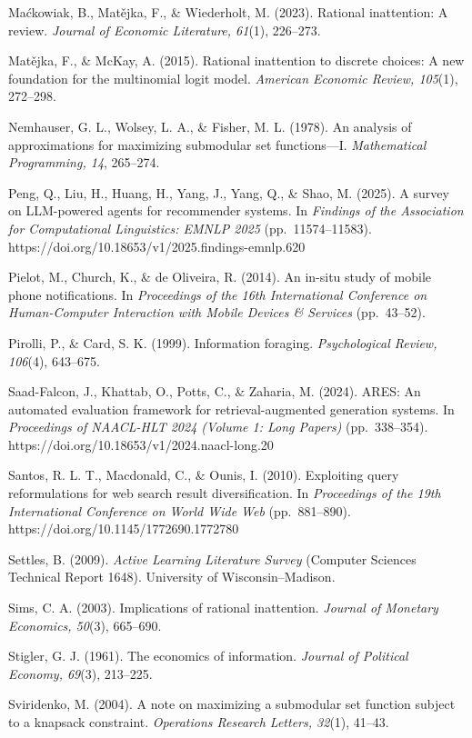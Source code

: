 \documentclass[
  11pt]{article}
\begin{document}
Maćkowiak, B., Matějka, F., \& Wiederholt, M. (2023). Rational
inattention: A review. \emph{Journal of Economic Literature, 61}(1),
226--273.

Matějka, F., \& McKay, A. (2015). Rational inattention to discrete
choices: A new foundation for the multinomial logit model.
\emph{American Economic Review, 105}(1), 272--298.

Nemhauser, G. L., Wolsey, L. A., \& Fisher, M. L. (1978). An analysis of
approximations for maximizing submodular set functions---I.
\emph{Mathematical Programming, 14}, 265--274.

Peng, Q., Liu, H., Huang, H., Yang, J., Yang, Q., \& Shao, M. (2025). A
survey on LLM-powered agents for recommender systems. In \emph{Findings
of the Association for Computational Linguistics: EMNLP 2025}
(pp.~11574--11583). https://doi.org/10.18653/v1/2025.findings-emnlp.620

Pielot, M., Church, K., \& de Oliveira, R. (2014). An in-situ study of
mobile phone notifications. In \emph{Proceedings of the 16th
International Conference on Human-Computer Interaction with Mobile
Devices \& Services} (pp.~43--52).

Pirolli, P., \& Card, S. K. (1999). Information foraging.
\emph{Psychological Review, 106}(4), 643--675.

Saad-Falcon, J., Khattab, O., Potts, C., \& Zaharia, M. (2024). ARES: An
automated evaluation framework for retrieval-augmented generation
systems. In \emph{Proceedings of NAACL-HLT 2024 (Volume 1: Long Papers)}
(pp.~338--354). https://doi.org/10.18653/v1/2024.naacl-long.20

Santos, R. L. T., Macdonald, C., \& Ounis, I. (2010). Exploiting query
reformulations for web search result diversification. In
\emph{Proceedings of the 19th International Conference on World Wide
Web} (pp.~881--890). https://doi.org/10.1145/1772690.1772780

Settles, B. (2009). \emph{Active Learning Literature Survey} (Computer
Sciences Technical Report 1648). University of Wisconsin--Madison.

Sims, C. A. (2003). Implications of rational inattention. \emph{Journal
of Monetary Economics, 50}(3), 665--690.

Stigler, G. J. (1961). The economics of information. \emph{Journal of
Political Economy, 69}(3), 213--225.

Sviridenko, M. (2004). A note on maximizing a submodular set function
subject to a knapsack constraint. \emph{Operations Research Letters,
32}(1), 41--43.
\end{document}
